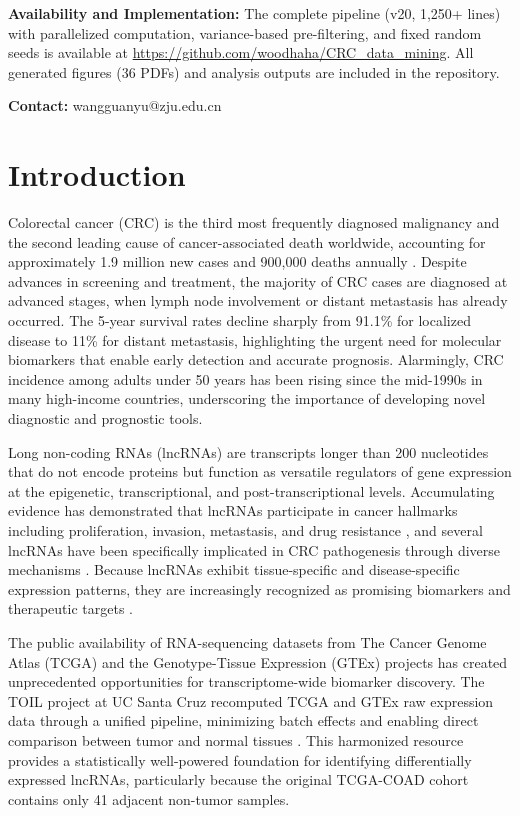 \documentclass[11pt,a4paper]{article}
\begin{document}
\textbf{Availability and Implementation:} The complete pipeline (v20, 1,250+ lines) with parallelized computation, variance-based pre-filtering, and fixed random seeds is available at \url{https://github.com/woodhaha/CRC\_data\_mining}. All generated figures (36 PDFs) and analysis outputs are included in the repository.

\textbf{Contact:} wangguanyu@zju.edu.cn

\vspace{1cm}

\section{Introduction}

Colorectal cancer (CRC) is the third most frequently diagnosed malignancy and the second leading cause of cancer-associated death worldwide, accounting for approximately 1.9 million new cases and 900,000 deaths annually \citep{RN1}. Despite advances in screening and treatment, the majority of CRC cases are diagnosed at advanced stages, when lymph node involvement or distant metastasis has already occurred. The 5-year survival rates decline sharply from 91.1\% for localized disease to 11\% for distant metastasis, highlighting the urgent need for molecular biomarkers that enable early detection and accurate prognosis. Alarmingly, CRC incidence among adults under 50 years has been rising since the mid-1990s in many high-income countries, underscoring the importance of developing novel diagnostic and prognostic tools.

Long non-coding RNAs (lncRNAs) are transcripts longer than 200 nucleotides that do not encode proteins but function as versatile regulators of gene expression at the epigenetic, transcriptional, and post-transcriptional levels. Accumulating evidence has demonstrated that lncRNAs participate in cancer hallmarks including proliferation, invasion, metastasis, and drug resistance \citep{RN3}, and several lncRNAs have been specifically implicated in CRC pathogenesis through diverse mechanisms \citep{RN4,RN5,RN6}. Because lncRNAs exhibit tissue-specific and disease-specific expression patterns, they are increasingly recognized as promising biomarkers and therapeutic targets \citep{RN7,RN8,RN9}.

The public availability of RNA-sequencing datasets from The Cancer Genome Atlas (TCGA) \citep{RN10} and the Genotype-Tissue Expression (GTEx) \citep{RN11} projects has created unprecedented opportunities for transcriptome-wide biomarker discovery. The TOIL project at UC Santa Cruz recomputed TCGA and GTEx raw expression data through a unified pipeline, minimizing batch effects and enabling direct comparison between tumor and normal tissues \citep{RN12}. This harmonized resource provides a statistically well-powered foundation for identifying differentially expressed lncRNAs, particularly because the original TCGA-COAD cohort contains only 41 adjacent non-tumor samples.
\end{document}
